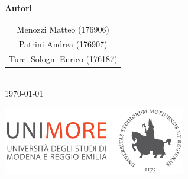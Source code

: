 \begin{titlepage}
    {\Large \textbf{\textcolor{tudelftdarkblue}{Autori}}}\\[0.5cm]
    \begin{tabular}{c}
        \Large \textcolor{tudelftdarkblue}{Menozzi Matteo (176906)} \\
        \Large \textcolor{tudelftdarkblue}{Patrini Andrea (176907)} \\
        \Large \textcolor{tudelftdarkblue}{Turci Sologni Enrico (176187)} \\
    \end{tabular}\\[2cm]
    
    {\Large \textcolor{tudelftdarkblue}{\today}}
    
    \vfill
    \begin{center}
        \includegraphics[width=0.6\textwidth]{images/Logo_C_Positivo_Colore.png}
    \end{center}
\end{titlepage}